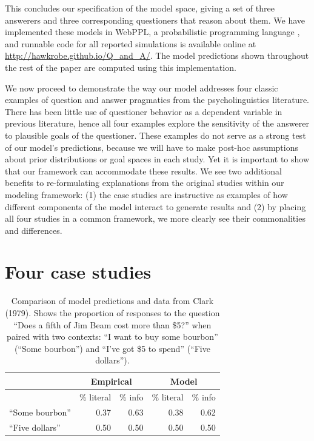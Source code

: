 \documentclass[12pt, floatsintext, jou]{apa6}
\begin{document}
This concludes our specification of the model space, giving a set of three answerers and three corresponding questioners that reason about them. We have implemented these models in WebPPL, a probabilistic programming language \cite{GoodmanStuhlmuller14_DIPPL}, and runnable code for all reported simulations is available online at \url{http://hawkrobe.github.io/Q\_and\_A/}. The model predictions shown throughout the rest of the paper are computed using this implementation. 

We now proceed to demonstrate the way our model addresses four classic examples of question and answer pragmatics from the psycholinguistics literature. There has been little use of questioner behavior as a dependent variable in previous literature, hence all four examples explore the sensitivity of the answerer to plausible goals of the questioner. 
These examples do not serve as a strong test of our model's predictions, because we will have to make post-hoc assumptions about prior distributions or goal spaces in each study.
Yet it is important to show that our framework can accommodate these results.
We see two additional benefits to re-formulating explanations from the original studies within our modeling framework: (1) the case studies are instructive as examples of how different components of the model interact to generate results and (2) by placing all four studies in a common framework, we more clearly see their commonalities and differences. 


\section{Four case studies}

\begin{table}[t]
\centering
\begin{tabular}{ p{3cm} | r | r ||||||  r | r }
& \multicolumn{2}{c||||||}{Empirical} & \multicolumn{2}{c}{Model} \\
\hline
&           \% literal &   \%  info &           \% literal &   \%  info    \\
\hline
``Some bourbon'' &   0.37 & 0.63 &  0.38 & 0.62 \\
\hline
``Five dollars''     & 0.50 & 0.50 & 0.50 & 0.50 \\
\end{tabular}
\\[1.5pt]
\caption{Comparison of model predictions and data from Clark (1979). Shows the proportion of responses to the question ``Does a fifth of Jim Beam cost more than \$5?'' when paired with two contexts: ``I want to buy some bourbon'' (``Some bourbon'') and ``I've got \$5 to spend'' (``Five dollars''). } 
\label{table:clark79exp4}
\end{table}
\end{document}
